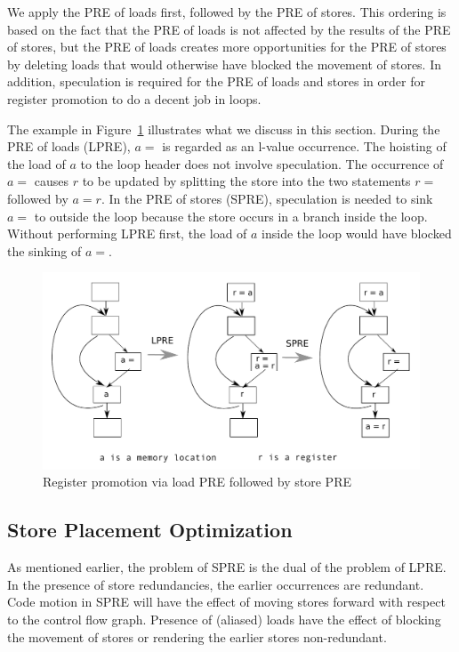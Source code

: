 We apply the PRE of loads
first, followed by the PRE of stores.  This ordering is based on the fact that
the PRE of loads is not affected by the results of the PRE of stores, but the
PRE of loads creates more opportunities for the PRE of stores by deleting
loads that would otherwise have blocked the movement of stores.  In addition,
speculation is required for the PRE of loads and stores in order for register
promotion to do a decent job in loops.  

The example in Figure~\ref{fig: promotion-example} illustrates what we discuss
in this section.  During the PRE of loads (LPRE), $a =$ is regarded as an
l-value occurrence.  The hoisting of the load of $a$ to the loop header does
not involve speculation. The occurrence of $a =$ causes $r$ to be updated
by splitting the store into the two statements $r =$ followed by $a = r$.  In 
the PRE of stores (SPRE), speculation is needed to sink $a =$ to outside the
loop because the store occurs in a branch inside the loop.  Without performing 
LPRE first, the load of $a$ inside the loop would
have blocked the sinking of $a =$.

\begin{figure}
\centering
\includegraphics[scale=0.55]{fig-promotion-example.pdf}
\caption{Register promotion via load PRE followed by store PRE}
\label{fig: promotion-example}
\end{figure}

\subsection{Store Placement Optimization}

As mentioned earlier, the problem of SPRE is the dual of the problem of LPRE.
In the presence of store redundancies, the earlier occurrences are redundant.
Code motion in SPRE will have the effect of moving stores forward with respect 
to the control flow graph.  Presence of (aliased) loads have the effect of
blocking the movement of stores or rendering the earlier stores non-redundant.

